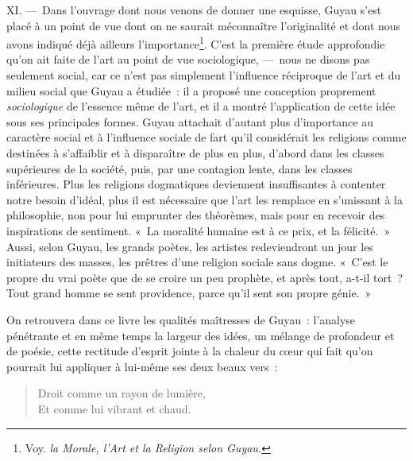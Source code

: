 \documentclass[french,twoside]{book} %
\begin{document}
XI. — Dans l’ouvrage dont nous venons de donner une esquisse, Guyau s’est placé à un point de vue dont on ne saurait méconnaître l’originalité et dont nous avons indiqué déjà ailleurs l’importance\footnote{ Voy. \emph{la Morale, l’Art et la Religion selon Guyau.}}. C’est la première étude approfondie qu’on ait faite de l’art au point de vue sociologique, — nous ne disons pas seulement social, car ce n’est pas simplement l’influence réciproque de l’art et du milieu social que Guyau a étudiée : il a proposé une conception proprement \emph{sociologique} de l’essence même de l’art, et il a montré l’application de cette idée sous ses principales formes. Guyau attachait d’autant plus d’importance au caractère social et à l’influence sociale de fart qu’il considérait les religions comme destinées à s’affaiblir et à disparaître de plus en plus, d’abord dans les classes supérieures de la société, puis, par une contagion lente, dans les classes inférieures. Plus les religions dogmatiques deviennent insuffisantes à contenter notre besoin d’idéal, plus il est nécessaire que l’art les remplace en s’unissant à la philosophie, non pour lui emprunter des théorèmes, mais pour en recevoir des inspirations de sentiment. « La moralité humaine est à ce prix, et la félicité. » Aussi, selon Guyau, les grands poètes, les artistes redeviendront un jour les initiateurs des masses, les prêtres d’une religion sociale sans dogme. « C’est le propre du vrai poète que de se croire un peu prophète, et après tout, a-t-il tort ? Tout grand homme se sent providence, parce qu’il sent son propre génie. »\par
On retrouvera dans ce livre les qualités maîtresses de Guyau : l’analyse pénétrante et en même temps la largeur des idées, un mélange de profondeur et de poésie, cette rectitude d’esprit jointe à la chaleur du cœur qui fait qu’on pourrait lui appliquer à lui-même ses deux beaux vers :\par


\begin{verse}
Droit comme un rayon de lumière,\\
Et comme lui vibrant et chaud.\\
\end{verse}
\end{document}
